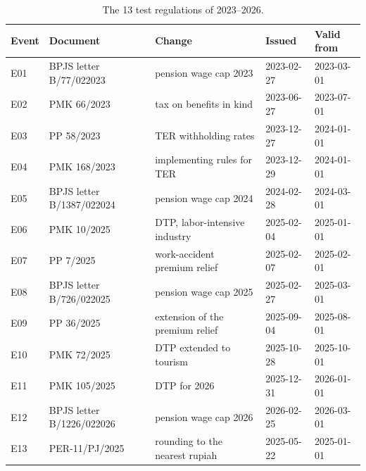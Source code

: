 \begin{table}[!t]
\caption{The 13 test regulations of 2023--2026.}
\label{tab:events}
\centering\footnotesize
\setlength{\tabcolsep}{4pt}
\begin{tabularx}{\textwidth}{@{}llLll@{}}
\toprule
Event & Document & Change & Issued & Valid from \\
\midrule
E01 & BPJS letter B/77/022023 & pension wage cap 2023 & 2023-02-27 & 2023-03-01 \\
E02 & PMK 66/2023 & tax on benefits in kind & 2023-06-27 & 2023-07-01 \\
E03 & PP 58/2023 & TER withholding rates & 2023-12-27 & 2024-01-01 \\
E04 & PMK 168/2023 & implementing rules for TER & 2023-12-29 & 2024-01-01 \\
E05 & BPJS letter B/1387/022024 & pension wage cap 2024 & 2024-02-28 & 2024-03-01 \\
E06 & PMK 10/2025 & DTP, labor-intensive industry & 2025-02-04 & 2025-01-01 \\
E07 & PP 7/2025 & work-accident premium relief & 2025-02-07 & 2025-02-01 \\
E08 & BPJS letter B/726/022025 & pension wage cap 2025 & 2025-02-27 & 2025-03-01 \\
E09 & PP 36/2025 & extension of the premium relief & 2025-09-04 & 2025-08-01 \\
E10 & PMK 72/2025 & DTP extended to tourism & 2025-10-28 & 2025-10-01 \\
E11 & PMK 105/2025 & DTP for 2026 & 2025-12-31 & 2026-01-01 \\
E12 & BPJS letter B/1226/022026 & pension wage cap 2026 & 2026-02-25 & 2026-03-01 \\
E13 & PER-11/PJ/2025 & rounding to the nearest rupiah & 2025-05-22 & 2025-01-01 \\
\bottomrule
\end{tabularx}
\end{table}

